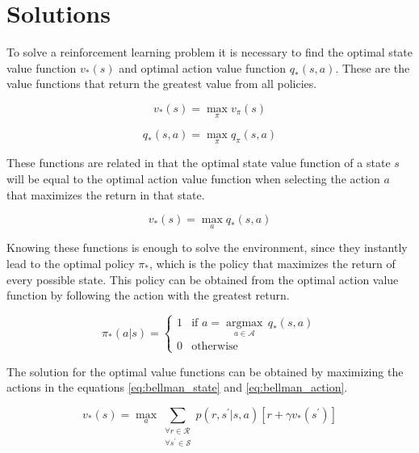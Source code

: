 \section{Solutions}

To solve a reinforcement learning problem it is necessary to find the optimal state value function $v_\ast(s)$ and optimal action value function $q_\ast(s,a)$. These are the value functions that return the greatest value from all policies.

\begin{equation}
    v_\ast(s) = \max_{\pi}{v_\pi(s)}
\end{equation}

\begin{equation}
    q_\ast(s,a) = \max_{\pi}{q_\pi(s,a)}
\end{equation}

These functions are related in that the optimal state value function of a state $s$ will be equal to the optimal action value function when selecting the action $a$ that maximizes the return in that state.

\begin{equation}
    v_\ast(s) = \max_{a}{q_\ast(s,a)}
\end{equation}

Knowing these functions is enough to solve the environment, since they instantly lead to the optimal policy $\pi_\ast$, which is the policy that maximizes the return of every possible state. This policy can be obtained from the optimal action value function by following the action with the greatest return.

\begin{equation}
    \pi_\ast(a|s) = 
    \begin{cases}
        1 &\textrm{if $a = \underset{a \in \mathcal{A}}{\operatorname{argmax}}$}\,q_\ast(s,a)\\
        0 &\textrm{otherwise}
    \end{cases}
\end{equation}

The solution for the optimal value functions can be obtained by maximizing the actions in the equations \ref{eq:bellman_state} and \ref{eq:bellman_action}.

\begin{equation}
    v_\ast(s) = \max_{a} \sum_{\substack{\forall r \in \mathcal{R} \\ \forall s^\prime \in \mathcal{S}}}{p(r,s^\prime|s,a)[r + \gamma v_\ast(s^\prime)]}
\end{equation}

